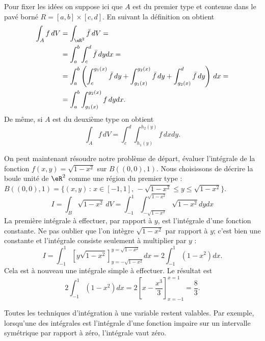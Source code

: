 Pour fixer les idées on suppose ici que $A$ est du premier type et contenue dans le pavé borné $R=[a,b]\times [c,d]$. En suivant la définition on obtient
\begin{equation}
  \begin{aligned}
    \int_A f\, dV&=\int_{\eR^2} \bar f\, dV=\\
    &= \int_a^b\int_c^d \bar f\, dy dx=\\
&= \int_a^b\left(\int_c^{g_1(x)} \bar f\, dy+\int_{g_1(x)}^{g_2(x)} \bar f\, dy+\int_{g_2(x)}^d \bar f\, dy\right)\, dx= \\
&= \int_a^b\int_{g_1(x)}^{g_2(x)}  f\, dy dx.
  \end{aligned}
\end{equation}
De même, si $A$ est du deuxième type on obtient
\begin{equation}
     \int_A f\, dV=\int_c^d\int_{h_1(y)}^{h_2(y)}  f\, dx dy.
\end{equation}
\begin{example}
	On peut maintenant résoudre notre problème de départ, évaluer l'intégrale de la fonction $f(x,y)=\sqrt{1-x^2}$ sur $B((0,0),1)$. Nous choisissons de décrire la boule unité de $\eR^2$ comme une région du premier type : $B((0,0),1)=\{(x,y)\, :\, x\in[-1,1], \, -\sqrt{1-x^2}\leq y\leq \sqrt{1-x^2} \}$.
	\begin{equation}
		I=\int_{B}\sqrt{1-x^2}\, dV=\int_{-1}^1\int_{-\sqrt{1-x^2}}^{\sqrt{1-x^2}}\sqrt{1-x^2}dydx
	\end{equation}
	La première intégrale à effectuer, par rapport à $y$, est l'intégrale d'une fonction constante. Ne pas oublier que l'on intègre $\sqrt{1-x^2}$ par rapport à $y$; c'est bien une constante et l'intégrale consiste seulement à multiplier par $y$ :
	\begin{equation}
		I=\int_{-1}^1\left[ y\sqrt{1-x^2} \right]_{y=-\sqrt{1-x^2}}^{y=\sqrt{1-x^2}}dx=2\int_{-1}^1(1-x^2)dx.
	\end{equation}
	Cela est à nouveau une intégrale simple à effectuer. Le résultat est
	\begin{equation}
		2\int_{-1}^1(1-x^2)dx=2\left[ x-\frac{ x^3 }{ 3 } \right]_{x=-1}^{x=1}=\frac{ 8 }{ 3 }.
	\end{equation}
\end{example}
\begin{remark}
	Toutes les techniques d'intégration à une variable restent valables. Par exemple, lorsqu'une des intégrales est l'intégrale d'une fonction impaire sur un intervalle symétrique par rapport à zéro, l'intégrale vaut zéro.
\end{remark}

